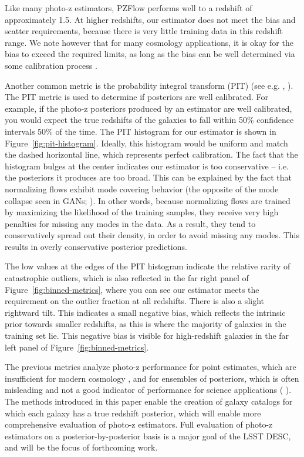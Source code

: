 \documentclass[twocolumn,twocolappendix]{aastex631}
\newcommand{\citePZp}{(\citetalias{schmidt2020} \citeyear{schmidt2020})\xspace}
\newcommand{\citePZa}{\citetalias{schmidt2020} \citeyear{schmidt2020}\xspace}
\begin{document}
Like many photo-z estimators, PZFlow performs well to a redshift of approximately 1.5.
At higher redshifts, our estimator does not meet the bias and scatter requirements, because there is very little training data in this redshift range.
We note however that for many cosmology applications, it is okay for the bias to exceed the required limits, as long as the bias can be well determined via some calibration process \citep{newman2015}.

Another common metric is the probability integral transform (PIT) (see e.g. \citePZa, \citealt{dey2022}).
The PIT metric is used to determine if posteriors are well calibrated.
For example, if the photo-z posteriors produced by an estimator are well calibrated, you would expect the true redshifts of the galaxies to fall within 50\% confidence intervals 50\% of the time.
The PIT histogram for our estimator is shown in Figure~\ref{fig:pit-histogram}.
Ideally, this histogram would be uniform and match the dashed horizontal line, which represents perfect calibration.
The fact that the histogram bulges at the center indicates our estimator is too conservative -- i.e. the posteriors it produces are too broad.
This can be explained by the fact that normalizing flows exhibit mode covering behavior (the opposite of the mode collapse seen in GANs; \citealt{salimans2016}).
In other words, because normalizing flows are trained by maximizing the likelihood of the training samples, they receive very high penalties for missing any modes in the data.
As a result, they tend to conservatively spread out their density, in order to avoid missing any modes.
This results in overly conservative posterior predictions.

The low values at the edges of the PIT histogram indicate the relative rarity of catastrophic outliers, which is also reflected in the far right panel of Figure~\ref{fig:binned-metrics}, where you can see our estimator meets the requirement on the outlier fraction at all redshifts.
There is also a slight rightward tilt.
This indicates a small negative bias, which reflects the intrinsic prior towards smaller redshifts, as this is where the majority of galaxies in the training set lie.
This negative bias is visible for high-redshift galaxies in the far left panel of Figure~\ref{fig:binned-metrics}.

The previous metrics analyze photo-z performance for point estimates, which are insufficient for modern cosmology \citep{newman2022}, and for ensembles of posteriors, which is often misleading and not a good indicator of performance for science applications \citePZp.
The methods introduced in this paper enable the creation of galaxy catalogs for which each galaxy has a true redshift posterior, which will enable more comprehensive evaluation of photo-z estimators.
Full evaluation of photo-z estimators on a posterior-by-posterior basis is a major goal of the LSST DESC, and will be the focus of forthcoming work.
\end{document}
